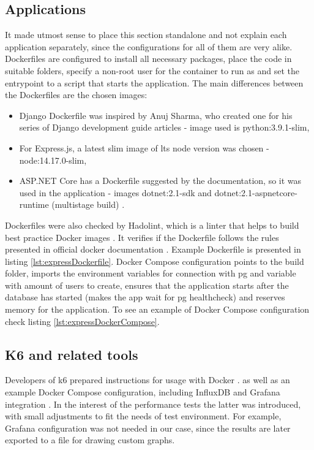 \subsection{Applications}
It made utmost sense to place this section standalone and not explain each application separately, since the configurations for all of them are very alike.
Dockerfiles are configured to install all necessary packages, place the code in suitable folders, specify a non-root user for the container to run as and set the entrypoint to a script that starts the application.
The main differences between the Dockerfiles are the chosen images:
\begin{itemize}
    \item Django Dockerfile was inspired by Anuj Sharma, who created one for his series of Django development guide articles \cite{djangoDockerfile} - image used is python:3.9.1-slim,
    \item For Express.js, a latest slim image of \acrshort{lts} node version was chosen - node:14.17.0-slim,
    \item ASP.NET Core has a Dockerfile suggested by the documentation, so it was used in the application - images dotnet:2.1-sdk and dotnet:2.1-aspnetcore-runtime (multistage build) \cite{aspnetDockerfile}.
\end{itemize}
Dockerfiles were also checked by Hadolint, which is a linter that helps to build best practice Docker images \cite{hadolintGit}.
It verifies if the Dockerfile follows the rules presented in official docker documentation \cite{dockerBestPractices}.
Example Dockerfile is presented in listing \ref{lst:expressDockerfile}.
Docker Compose configuration points to the build folder, imports the environment variables for connection with \acrshort{pg} and variable with amount of users to create, ensures that the application starts after the database has started (makes the app wait for \acrlong{pg} healthcheck) and reserves memory for the application. To see an example of Docker Compose configuration check listing \ref{lst:expressDockerCompose}.



\subsection{K6 and related tools}
Developers of k6 prepared instructions for usage with Docker \cite{k6RunningLocalTests}.
as well as an example Docker Compose configuration, including InfluxDB and Grafana integration \cite{k6DockerCompose}.
In the interest of the performance tests the latter was introduced, with small adjustments to fit the needs of test environment. For example, Grafana configuration was not needed in our case, since the results are later exported to a file for drawing custom graphs.

